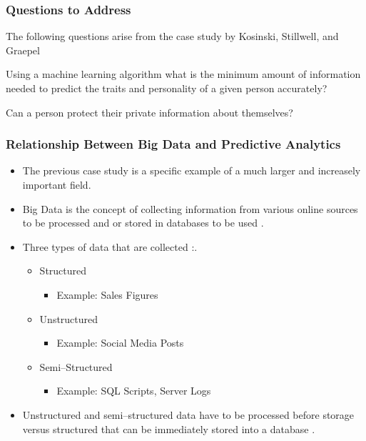 \documentclass{beamer}
\begin{document}
\begin{frame}
\frametitle{Questions to Address}
The following questions arise from the case study by Kosinski, Stillwell, and Graepel \cite{Kosinski2013}
\begin{q1}
Using a machine learning algorithm what is the minimum amount of information needed to predict the traits and personality of a given person accurately? 
\end{q1}
\begin{q2}
Can a person protect their private information about themselves?
\end{q2}
\end{frame}

\begin{frame}
\frametitle{Relationship Between Big Data and Predictive Analytics}
\begin{itemize}
    \item The previous case study is a specific example of a much larger and increasely important field. 
    \item Big Data is the concept of collecting information from various online sources to be processed and or stored in databases to be used \cite{Jeble2016}.
    \item Three types of data that are collected \cite{Jeble2016}:.
    \begin{itemize}
    \item Structured
        \begin{itemize}
        \item Example: Sales Figures
        \end{itemize}
    \item Unstructured
        \begin{itemize}
        \item Example: Social Media Posts
        \end{itemize}
    \item Semi--Structured
        \begin{itemize}
        \item Example: SQL Scripts, Server Logs
        \end{itemize}
    \end{itemize}
\item Unstructured and semi--structured data have to be processed before storage versus structured that can be immediately stored into a database \cite{Jeble2016}.
\end{itemize}
\end{frame}
\end{document}
